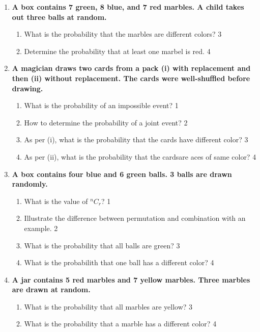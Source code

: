 \documentclass[a4paper,oneside, margin=1.4in]{book}
\begin{document}
\begin{enumerate}
     \item
	  \textbf{A box contains 7 green, 8 blue, and 7 red marbles. A child takes out three balls at random.} 
  
  \begin{enumerate}
    \item  
	What is the probability that the marbles are different colors? \hfill 3
    \item
	Determine the probability that at least one marbel is red. \hfill 4
  \end{enumerate}

 \item
	  \textbf{A magician draws two cards from a pack (i) with replacement and then (ii) without replacement. The cards were well-shuffled before drawing.} 
  
  \begin{enumerate}
    \item
	What is the probability of an impossible event? \hfill 1
    \item
	How to determine the probability of a joint event?  \hfill 2
    \item  
	As per (i), what is the probability that the cards have different color? \hfill 3
    \item
	As per (ii), what is the probability that the cardsare aces of same color?  \hfill 4
  \end{enumerate}

 \item
	  \textbf{A box contains four blue and 6 green balls. 3 balls are drawn randomly.} 
  
  \begin{enumerate}
    \item
	What is the value of $^nC_r$? \hfill 1
    \item
	Illustrate the difference between permutation and combination with an example. \hfill 2
    \item  
	What is the probability that all balls are green? \hfill 3
    \item
	What is the probabilith that one ball has a different color? \hfill 4
  \end{enumerate}
  
  \item
	  \textbf{A jar contains 5 red marbles and 7 yellow marbles. 
	  Three marbles are drawn at random.} 
  
  \begin{enumerate}
    \item  
	What is the probability that all marbles are yellow? \hfill 3
    \item
	What is the probability that a marble has a different color? \hfill 4
  \end{enumerate}



\end{enumerate}
\end{document}
